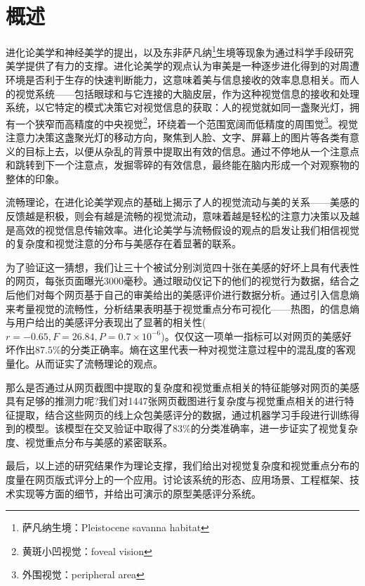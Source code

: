 
\chapter{概述}
\label{chap:introduction}
进化论美学和神经美学的提出，以及东非萨凡纳\footnote{萨凡纳生境：Pleistocene savanna habitat}生境等现象为通过科学手段研究美学提供了有力的支撑。进化论美学的观点认为审美是一种逐步进化得到的对周遭环境是否利于生存的快速判断能力，这意味着美与信息接收的效率息息相关。而人的视觉系统——包括眼球和与它连接的大脑皮层，作为这种视觉信息的接收和处理系统，以它特定的模式决策它对视觉信息的获取：人的视觉就如同一盏聚光灯，拥有一个狭窄而高精度的中央视觉\footnote{黄斑小凹视觉：foveal vision}，环绕着一个范围宽阔而低精度的周围觉\footnote{外围视觉：peripheral area}。视觉注意力决策这盏聚光灯的移动方向，聚焦到人脸、文字、屏幕上的图片等各类有意义的目标上去，以便从杂乱的背景中提取出有效的信息。通过不停地从一个注意点和跳转到下一个注意点，发掘零碎的有效信息，最终能在脑内形成一个对观察物的整体的印象。

流畅理论，在进化论美学观点的基础上揭示了人的视觉流动与美的关系——美感的反馈越是积极，则会有越是流畅的视觉流动，意味着越是轻松的注意力决策以及越是高效的视觉信息传输效率。进化论美学与流畅假设的观点的启发让我们相信视觉的复杂度和视觉注意的分布与美感存在着显著的联系。

为了验证这一猜想，我们让三十个被试分别浏览四十张在美感的好坏上具有代表性的网页，每张页面曝光3000毫秒。通过眼动仪记下的他们的视觉行为数据，结合之后他们对每个网页基于自己的审美给出的美感评价进行数据分析。通过引入信息熵来考量视觉的流畅性，分析结果表明基于视觉重点分布可视化——热图，的信息熵与用户给出的美感评分表现出了显著的相关性($r=-0.65, F=26.84, P=0.7\times 10^{-6}$)。仅仅这一项单一指标可以对网页的美感好坏作出$87.5\%$的分类正确率。熵在这里代表一种对视觉注意过程中的混乱度的客观量化。从而证实了流畅理论的观点。

那么是否通过从网页截图中提取的复杂度和视觉重点相关的特征能够对网页的美感具有足够的推测力呢?我们对1447张网页截图进行复杂度与视觉重点相关的进行特征提取，结合这些网页的线上众包美感评分的数据，通过机器学习手段进行训练得到的模型。该模型在交叉验证中取得了$83\%$的分类准确率，进一步证实了视觉复杂度、视觉重点分布与美感的紧密联系。

最后，以上述的研究结果作为理论支撑，我们给出对视觉复杂度和视觉重点分布的度量在网页版式评分上的一个应用。讨论该系统的形态、应用场景、工程框架、技术实现等方面的细节，并给出可演示的原型美感评分系统。
